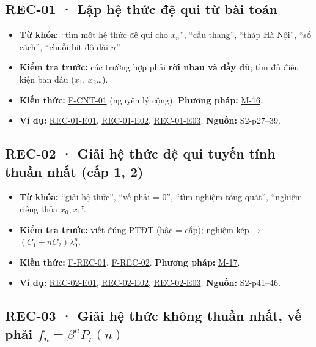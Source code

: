 \documentclass[
  10pt,
  twoside,openany]{book}
\providecommand{\tightlist}{%
  \setlength{\itemsep}{0pt}\setlength{\parskip}{0pt}}
\begin{document}
\hypertarget{REC-01}{%
\subsection{REC-01 · Lập hệ thức đệ qui từ bài toán}\label{REC-01}}

\begin{itemize}
\tightlist
\item
  \textbf{Từ khóa:} ``tìm một hệ thức đệ qui cho \(x_n\)'', ``cầu
  thang'', ``tháp Hà Nội'', ``số cách'', ``chuỗi bit độ dài \(n\)''.
\item
  \textbf{Kiểm tra trước:} các trường hợp phải \textbf{rời nhau và đầy
  đủ}; tìm đủ điều kiện ban đầu (\(x_1\), \(x_2\)\ldots).
\item
  \textbf{Kiến thức:} \protect\hyperlink{F-CNT-01}{F-CNT-01} (nguyên lý
  cộng). \textbf{Phương pháp:} \protect\hyperlink{M-16}{M-16}.
\item
  \textbf{Ví dụ:} \protect\hyperlink{REC-01-E01}{REC-01-E01},
  \protect\hyperlink{REC-01-E02}{REC-01-E02},
  \protect\hyperlink{REC-01-E03}{REC-01-E03}. \textbf{Nguồn:}
  S2-p27--39.
\end{itemize}

\hypertarget{REC-02}{%
\subsection{REC-02 · Giải hệ thức đệ qui tuyến tính thuần nhất (cấp 1,
2)}\label{REC-02}}

\begin{itemize}
\tightlist
\item
  \textbf{Từ khóa:} ``giải hệ thức'', ``vế phải = 0'', ``tìm nghiệm tổng
  quát'', ``nghiệm riêng thỏa \(x_0, x_1\)''.
\item
  \textbf{Kiểm tra trước:} viết đúng PTĐT (bậc = cấp); nghiệm kép →
  \((C_1+nC_2)\lambda_0^n\).
\item
  \textbf{Kiến thức:} \protect\hyperlink{F-REC-01}{F-REC-01},
  \protect\hyperlink{F-REC-02}{F-REC-02}. \textbf{Phương pháp:}
  \protect\hyperlink{M-17}{M-17}.
\item
  \textbf{Ví dụ:} \protect\hyperlink{REC-02-E01}{REC-02-E01},
  \protect\hyperlink{REC-02-E02}{REC-02-E02},
  \protect\hyperlink{REC-02-E03}{REC-02-E03}. \textbf{Nguồn:}
  S2-p41--46.
\end{itemize}

\hypertarget{REC-03}{%
\subsection{\texorpdfstring{REC-03 · Giải hệ thức không thuần nhất, vế
phải
\(f_n=\beta^nP_r(n)\)}{REC-03 · Giải hệ thức không thuần nhất, vế phải f\_n=\textbackslash beta\^{}nP\_r(n)}}\label{REC-03}}
\end{document}
